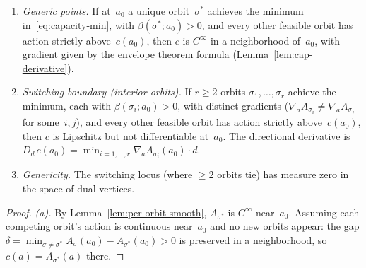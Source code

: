 \begin{unverified}
\begin{proposition}%
\label{prop:capacity-smoothness-classification}
\begin{enumerate}
\item[\textup{(a)}]
  \emph{Generic points.}
  If at~$a_0$ a unique orbit~$\sigma^*$ achieves the minimum
  in~\eqref{eq:capacity-min}, with $\beta(\sigma^*; a_0) > 0$,
  and every other feasible orbit has action strictly above~$c(a_0)$,
  then $c$ is $C^\infty$ in a neighborhood of~$a_0$,
  with gradient given by the envelope theorem formula
  (Lemma~\ref{lem:cap-derivative}).

\item[\textup{(b)}]
  \emph{Switching boundary (interior orbits).}
  If $r \geq 2$ orbits $\sigma_1, \ldots, \sigma_r$ achieve the
  minimum, each with $\beta(\sigma_i; a_0) > 0$,
  with distinct gradients
  ($\nabla_a A_{\sigma_i} \neq \nabla_a A_{\sigma_j}$
  for some~$i, j$),
  and every other feasible orbit has action strictly above~$c(a_0)$,
  then $c$ is Lipschitz but not differentiable at~$a_0$.
  The directional derivative is
  $D_d\, c(a_0) = \min_{i=1,\ldots,r} \nabla_a A_{\sigma_i}(a_0) \cdot d$.


\item[\textup{(c)}]
  \emph{Genericity.}
  The switching locus (where $\geq 2$ orbits tie)
  has measure zero in the space of dual vertices.
\end{enumerate}
\end{proposition}

\begin{proof}
\emph{(a).}
By Lemma~\ref{lem:per-orbit-smooth},
$A_{\sigma^*}$ is $C^\infty$ near~$a_0$.
Assuming each competing orbit's action is continuous near~$a_0$
and no new orbits appear:
the gap $\delta = \min_{\sigma \neq \sigma^*}
A_\sigma(a_0) - A_{\sigma^*}(a_0) > 0$ is preserved
in a neighborhood, so $c(a) = A_{\sigma^*}(a)$ there.


\end{proof}
\end{unverified}
